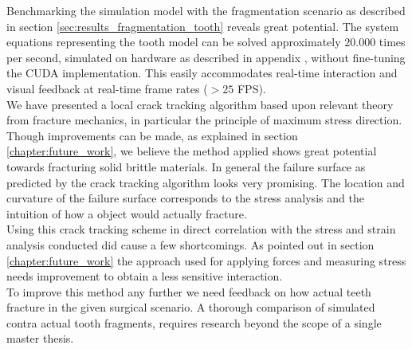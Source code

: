 %
Benchmarking the simulation model with the fragmentation scenario as
described in section \vref{sec:results_fragmentation_tooth} reveals great
potential. 
%
The system equations representing the tooth model can be solved
approximately $20.000$ times per second, simulated on hardware as
described in appendix , without
fine-tuning the CUDA implementation. This easily accommodates
real-time interaction and visual feedback at real-time frame rates ($>
25$ FPS). \\

We have presented a local crack tracking algorithm based upon relevant 
theory from fracture mechanics, in particular the principle of maximum
stress direction. 
%
Though improvements can be made, as explained in section
\vref{chapter:future_work}, we believe the method applied 
shows great potential towards fracturing solid brittle materials.
%
In general the failure surface as predicted by the
crack tracking algorithm looks very promising. The location and
curvature of the failure surface corresponds to the stress analysis
and the intuition of how a object would actually fracture. \\

Using this crack tracking scheme in direct correlation with
the stress and strain analysis conducted did cause a few
shortcomings. As pointed out in section \vref{chapter:future_work} the
approach used for applying forces and 
measuring stress needs improvement to obtain a less sensitive
interaction. \\

To improve this method any further we need feedback on how actual teeth
fracture in the given surgical scenario. A thorough comparison of simulated
contra actual tooth fragments, requires research beyond the scope of a
single master thesis.



